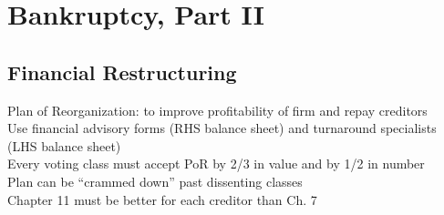 \section{Bankruptcy, Part II}
	\subsection*{Financial Restructuring}
	Plan of Reorganization: to improve profitability of firm and repay creditors\\
	Use financial advisory forms (RHS balance sheet) and turnaround specialists (LHS balance sheet)\\
	Every voting class must accept PoR by 2/3 in value and by 1/2 in number\\
	Plan can be ``crammed down'' past dissenting classes\\
	Chapter 11 must be better for each creditor than Ch. 7
	